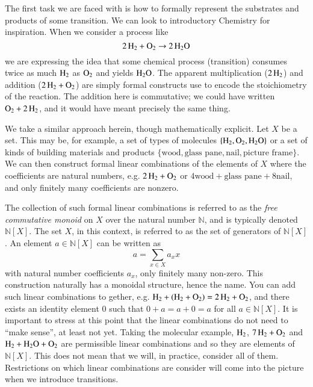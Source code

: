 \documentclass[aps,prd,onecolumn,nofootinbib,letterpaper,preprintnumbers,superscriptaddress,eqsecnum]{revtex4}
\theoremstyle{definition}
\newcommand{\N}{\mathbb{N}}
\begin{document}
The first task we are faced with is how to formally represent the substrates and products of some transition.
We can look to introductory Chemistry for inspiration.
When we consider a process like
\begin{equation*}
    \ce{2H_2} + \ce{O_2} \rightarrow \ce{2H_2O}
\end{equation*}
we are expressing the idea that some chemical process (transition) consumes twice as much $\ce{H_2}$ as $\ce{O_2}$ and yields $\ce{H_2O}$.
The apparent multiplication ($\ce{2H_2}$) and addition ($\ce{2H_2} + \ce{O_2}$) are simply formal constructs use to encode the stoichiometry of the reaction.
The addition here is commutative; we could have written $\ce{O_2} + \ce{2H_2}$, and it would have meant precisely the same thing.

We take a similar approach herein, though mathematically explicit. Let $X$ be a set. This may be, for example, a set of types of molecules $\{\ce{H_2}, \ce{O_2}, \ce{H_2O}\}$ or a set of kinds of building materials and products $\{\textrm{wood}, \textrm{glass pane}, \textrm{nail}, \textrm{picture frame}\}$.
We can then construct formal linear combinations of the elements of $X$ where the coefficients are natural numbers, e.g. $\ce{2H_2} + \ce{O_2}$ or $4\textrm{wood} + \textrm{glass pane} + 8\textrm{nail}$, and only finitely many coefficients are nonzero.

The collection of such formal linear combinations is referred to as the \textit{free commutative monoid} on $X$ over the natural number $\N$, and is typically denoted $\N[X]$.
The set $X$, in this context, is referred to as the set of generators of $\N[X]$.
An element $a \in \N[X]$ can be written as
\begin{equation*}
    a = \sum_{x \in X} a_x x
\end{equation*}
with natural number coefficients $a_x$, only finitely many non-zero.
This construction naturally has a monoidal structure, hence the name.
You can add such linear combinations to gether, e.g. $\ce{H_2} + (\ce{H_2} + \ce{O_2}) = \ce{2H_2} + \ce{O_2}$, and there exists an identity element $0$ such that $0 + a = a + 0 = a$ for all $a \in \N[X]$.
It is important to stress at this point that the linear combinations do not need to ``make sense'', at least not yet.
Taking the molecular example, $\ce{H_2}$, $\ce{7H_2} + \ce{O_2}$ and $\ce{H_2} + \ce{H_2O} + \ce{O_2}$ are permissible linear combinations and so they are elements of $\N[X]$.
This does not mean that we will, in practice, consider all of them.
Restrictions on which linear combinations are consider will come into the picture when we introduce transitions.
\end{document}
